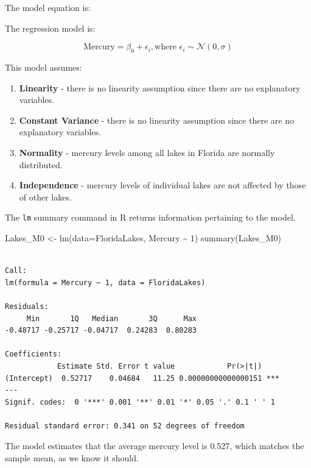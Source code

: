 \documentclass[
  letterpaper,
  DIV=11,
  numbers=noendperiod]{scrreprt}
\newenvironment{Shaded}{\begin{snugshade}}{\end{snugshade}}
\newcommand{\AttributeTok}[1]{\textcolor[rgb]{0.40,0.45,0.13}{#1}}
\newcommand{\DecValTok}[1]{\textcolor[rgb]{0.68,0.00,0.00}{#1}}
\newcommand{\FunctionTok}[1]{\textcolor[rgb]{0.28,0.35,0.67}{#1}}
\newcommand{\NormalTok}[1]{\textcolor[rgb]{0.00,0.23,0.31}{#1}}
\newcommand{\OtherTok}[1]{\textcolor[rgb]{0.00,0.23,0.31}{#1}}
\newcommand{\SpecialCharTok}[1]{\textcolor[rgb]{0.37,0.37,0.37}{#1}}
\begin{document}
The model equation is:

The regression model is:

\[
\text{Mercury} = \beta_0  + \epsilon_i, \text{where } \epsilon_i\sim\mathcal{N}(0, \sigma) 
\]

This model assumes:

\begin{enumerate}
\def\labelenumi{\arabic{enumi}.}
\item
  \textbf{Linearity} - there is no linearity assumption since there are
  no explanatory variables.
\item
  \textbf{Constant Variance} - there is no linearity assumption since
  there are no explanatory variables.
\item
  \textbf{Normality} - mercury levels among all lakes in Florida are
  normally distributed.
\item
  \textbf{Independence} - mercury levels of individual lakes are not
  affected by those of other lakes.
\end{enumerate}

The \texttt{lm} summary command in R returns information pertaining to
the model.

\begin{Shaded}
\begin{Highlighting}[]
\NormalTok{Lakes\_M0 }\OtherTok{\textless{}{-}} \FunctionTok{lm}\NormalTok{(}\AttributeTok{data=}\NormalTok{FloridaLakes, Mercury }\SpecialCharTok{\textasciitilde{}} \DecValTok{1}\NormalTok{)}
\FunctionTok{summary}\NormalTok{(Lakes\_M0)}
\end{Highlighting}
\end{Shaded}

\begin{verbatim}

Call:
lm(formula = Mercury ~ 1, data = FloridaLakes)

Residuals:
     Min       1Q   Median       3Q      Max 
-0.48717 -0.25717 -0.04717  0.24283  0.80283 

Coefficients:
            Estimate Std. Error t value            Pr(>|t|)    
(Intercept)  0.52717    0.04684   11.25 0.00000000000000151 ***
---
Signif. codes:  0 '***' 0.001 '**' 0.01 '*' 0.05 '.' 0.1 ' ' 1

Residual standard error: 0.341 on 52 degrees of freedom
\end{verbatim}

The model estimates that the average mercury level is 0.527, which
matches the sample mean, as we know it should.
\end{document}
